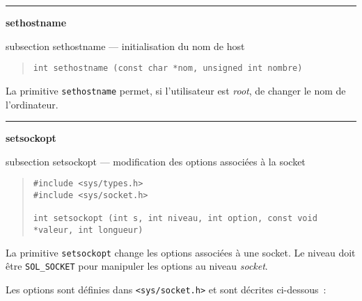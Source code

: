 \documentclass [twoside] {report}
\newcommand {\primitive} [1]
    {
	{\large \bf #1}
	\addcontentsline {toc} {subsection} {#1}
    }
\newcommand {\separation}
    {
	\vspace {7mm}
	\nopagebreak
	\hrule
    }
\begin{document}

\separation
\primitive {sethostname} --- initialisation du nom de host

\begin {quote}
\begin {verbatim}
int sethostname (const char *nom, unsigned int nombre)
\end{verbatim}
\end {quote}

La primitive {\tt sethostname} permet, si l'utilisateur est
{\em root}, de changer le nom de l'ordinateur.


\separation
\primitive {setsockopt} --- modification des options associées à la socket

\begin {quote}
\begin {verbatim}
#include <sys/types.h>
#include <sys/socket.h>

int setsockopt (int s, int niveau, int option, const void *valeur, int longueur)
\end{verbatim}
\end {quote}

La primitive {\tt setsockopt} change les options associées à
une socket. Le niveau doit être {\tt SOL\_SOCKET} pour
manipuler les options au niveau {\em socket}.

Les options sont définies dans {\tt <sys/socket.h>} et sont
décrites ci-dessous~:
\end{document}
